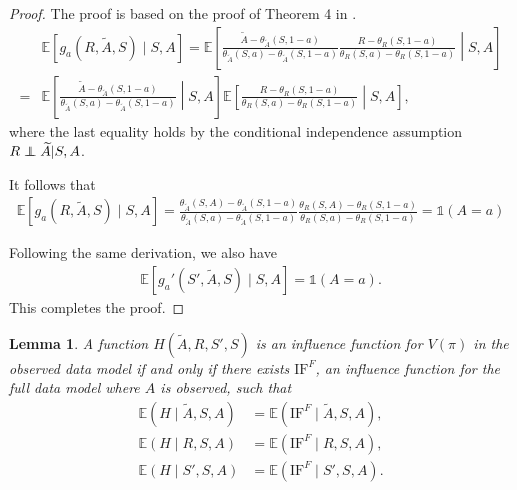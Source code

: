 \documentclass[12pt]{article}
\newcommand\independent{\protect\mathpalette{\protect\independenT}{\perp}}
\def\independenT#1#2{\mathrel{\rlap{$#1#2$}\mkern2mu{#1#2}}}
\newcommand{\0}{\boldsymbol{0}}
\newtheorem{lemma}{Lemma}
\newcommand{\E}{\mathbb{E}}
\begin{document}
\begin{proof}
The proof is based on the proof of Theorem 4 in \citet{zhou2024causal}.
    \begin{align*}
& \E[g_a(R,\widetilde A, S)\mid S,A]= \E\left[\frac{\widetilde A-\theta_{\widetilde A}(S,1-a)}{\theta_{\widetilde A}(S,a)-\theta_{\widetilde A}(S,1-a)} \frac{R-\theta_{R}(S,1-a)}{\theta_{R}(S,a)-\theta_{R}(S,1-a)} \middle| S,A\right]\\
        = & \E\left[\frac{\widetilde A-\theta_{\widetilde A}(S,1-a)}{\theta_{\widetilde A}(S,a)-\theta_{\widetilde A}(S,1-a)}  \middle| S,A\right] \E\left[\frac{R-\theta_{R}(S,1-a)}{\theta_{R}(S,a)-\theta_{R}(S,1-a)} \middle| S,A\right],
    \end{align*}where the last equality holds by the conditional independence assumption $R\independent \widetilde A| S,A$.

    It follows that 
  \begin{align*}
\E[g_a(R,\widetilde A, S)\mid S,A]= \frac{\theta_{\widetilde A}(S,A)-\theta_{\widetilde A}(S,1-a)}{\theta_{\widetilde A}(S,a)-\theta_{\widetilde A}(S,1-a)}  \frac{\theta_{R}(S,A)-\theta_{R}(S,1-a)}{\theta_{R}(S,a)-\theta_{R}(S,1-a)} =\mathds 1(A=a)
    \end{align*}

Following the same derivation, we also have 
\begin{gather*}
\E[g_a'(S',\widetilde A, S)\mid S,A]=\mathds 1(A=a).
    \end{gather*}
This completes the proof.
\end{proof} 

\begin{lemma} \label{lemma:IF_condition}
A function $H(\widetilde{A},R,S',S)$ is an influence function for $V(\pi)$ in the observed data model if and only if there exists $\text{IF}^F$, an influence function for the full data model where $A$ is observed, such that 
\begin{align}
\mathbb E(H\mid \widetilde A,S,A) &= \mathbb E(\text{IF}^F\mid \widetilde A,S,A), \nonumber\\
\mathbb E(H\mid R,S,A) &= \mathbb E(\text{IF}^F\mid R,S,A), \\
\mathbb E(H\mid S',S,A) &= \mathbb E(\text{IF}^F\mid S',S,A). \nonumber
\end{align}
\end{lemma}
\end{document}

